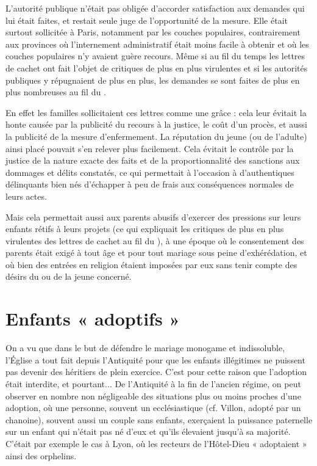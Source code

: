  L'autorité publique n'était pas obligée d'accorder satisfaction aux demandes qui lui était faites, et restait seule juge de l'opportunité de la mesure. Elle était surtout sollicitée à Paris, notamment par les couches populaires, contrairement aux provinces où l'internement administratif était moins facile à obtenir et où les couches populaires n'y avaient guère recours. Même si au fil du temps les lettres de cachet ont fait l'objet de critiques de plus en plus virulentes et si les autorités publiques y répugnaient de plus en plus, les demandes se sont faites de plus en plus nombreuses au fil du . 

 En effet les familles sollicitaient ces lettres comme une grâce : cela leur évitait la honte causée par la publicité du recours à la justice, le coût d'un procès, et aussi la publicité de la mesure d'enfermement. La réputation du jeune (ou de l'adulte) ainsi placé pouvait s'en relever plus facilement. Cela évitait le contrôle par la justice de la nature exacte des faits et de la proportionnalité des sanctions aux dommages et délits constatés, ce qui permettait à l'occasion à d'authentiques délinquants bien nés d'échapper à peu de frais aux conséquences normales de leurs actes. 

Mais cela permettait aussi aux parents abusifs d'exercer des pressions sur leurs enfants rétifs à leurs projets (ce qui expliquait les critiques de plus en plus virulentes des lettres de cachet au fil du ), à une époque où le consentement des parents était exigé à tout âge et pour tout mariage sous peine d'exhérédation, et où bien des entrées en religion étaient imposées par eux sans tenir compte des désirs du ou de la jeune concerné. 

\section{Enfants « adoptifs »}

 On a vu que dans le but de défendre le mariage monogame et indissoluble, l'Église a tout fait depuis l'Antiquité pour que les enfants illégitimes ne puissent pas devenir des héritiers de plein exercice. C'est pour cette raison que l'adoption était interdite, et pourtant... De l'Antiquité à la fin de l'ancien régime, on peut observer en nombre non négligeable des situations plus ou moins proches d'une adoption, où une personne, souvent un ecclésiastique (cf. \hbox{Villon}, adopté par un chanoine), souvent aussi un couple sans enfants, exerçaient la puissance paternelle sur un enfant qui n'était pas né d'eux et qu'ils élevaient jusqu'à sa majorité. C'était par exemple le cas à Lyon, où les recteurs de l'Hôtel-Dieu « adoptaient » ainsi des orphelins. 

